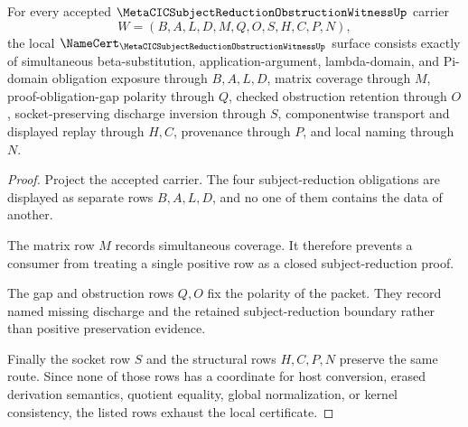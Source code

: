 \begin{theorem}
\label{thm:metacic-subject-reduction-obstruction-witness-obligations}
For every accepted $\MetaCICSubjectReductionObstructionWitnessUp$ carrier
$$
W=(B,A,L,D,M,Q,O,S,H,C,P,N),
$$
the local $\NameCert_{\MetaCICSubjectReductionObstructionWitnessUp}$ surface consists exactly of simultaneous beta-substitution, application-argument, lambda-domain, and Pi-domain obligation exposure through $B,A,L,D$, matrix coverage through $M$, proof-obligation-gap polarity through $Q$, checked obstruction retention through $O$, socket-preserving discharge inversion through $S$, componentwise transport and displayed replay through $H,C$, provenance through $P$, and local naming through $N$.
\end{theorem}
\begin{proof}
Project the accepted carrier. The four subject-reduction obligations are displayed as separate rows $B,A,L,D$, and no one of them contains the data of another.

The matrix row $M$ records simultaneous coverage. It therefore prevents a consumer from treating a single positive row as a closed subject-reduction proof.

The gap and obstruction rows $Q,O$ fix the polarity of the packet. They record named missing discharge and the retained subject-reduction boundary rather than positive preservation evidence.

Finally the socket row $S$ and the structural rows $H,C,P,N$ preserve the same route. Since none of those rows has a coordinate for host conversion, erased derivation semantics, quotient equality, global normalization, or kernel consistency, the listed rows exhaust the local certificate.
\end{proof}

